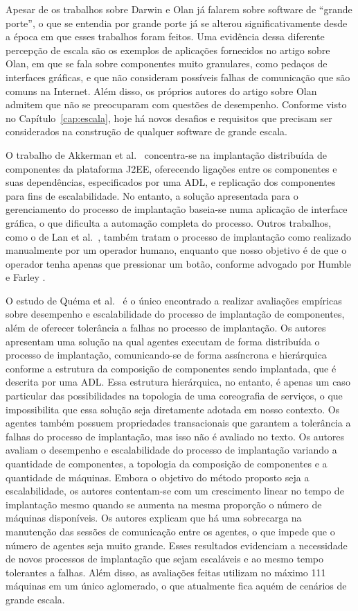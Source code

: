 Apesar de os trabalhos sobre Darwin e Olan já falarem sobre software de ``grande porte'', o que se entendia por grande porte já se alterou significativamente desde a época em que esses trabalhos foram feitos. Uma evidência dessa diferente percepção de escala são os exemplos de aplicações fornecidos no artigo sobre Olan, em que se fala sobre componentes muito granulares, como pedaços de interfaces gráficas, e que não consideram possíveis falhas de comunicação que são comuns na Internet. Além disso, os próprios autores do artigo sobre Olan admitem que não se preocuparam com questões de desempenho. Conforme visto no Capítulo~\ref{cap:escala}, hoje há novos desafios e requisitos que precisam ser considerados na construção de qualquer software de grande escala.

O trabalho de Akkerman et al.~\cite{akkerman2005j2ee} concentra-se na implantação distribuída de componentes da plataforma J2EE, oferecendo ligações entre os componentes e suas dependências, especificados por uma ADL, e replicação dos componentes para fins de escalabilidade. No entanto, a solução apresentada para o gerenciamento do processo de implantação baseia-se numa aplicação de interface gráfica, o que dificulta a automação completa do processo. Outros trabalhos, como o de Lan et al.~\cite{lan2005architecture}, também tratam o processo de implantação como realizado manualmente por um operador humano, enquanto que nosso objetivo é de que o operador tenha apenas que pressionar um botão, conforme advogado por Humble e Farley \cite{Humble2011Continuous}.

O estudo de Quéma et al.~\cite{quema2004hierarchical} é o único encontrado a realizar avaliações empíricas sobre desempenho e escalabilidade do processo de implantação de componentes, além de oferecer tolerância a falhas no processo de implantação. Os autores apresentam uma solução na qual agentes executam de forma distribuída o processo de implantação, comunicando-se de forma assíncrona e hierárquica conforme a estrutura da composição de componentes sendo implantada, que é descrita por uma ADL. Essa estrutura hierárquica, no entanto, é apenas um caso particular das possibilidades na topologia de uma coreografia de serviços, o que impossibilita que essa solução seja diretamente adotada em nosso contexto. Os agentes também possuem propriedades transacionais que garantem a tolerância a falhas do processo de implantação, mas isso não é avaliado no texto. Os autores avaliam o desempenho e escalabilidade do processo de implantação variando a quantidade de componentes, a topologia da composição de componentes e a quantidade de máquinas. Embora o objetivo do método proposto seja a escalabilidade, os autores contentam-se com um crescimento linear no tempo de implantação mesmo quando se aumenta na mesma proporção o número de máquinas disponíveis. Os autores explicam que há uma sobrecarga na manutenção das sessões de comunicação entre os agentes, o que impede que o número de agentes seja muito grande. Esses resultados evidenciam a necessidade de novos processos de implantação que sejam escaláveis e ao mesmo tempo tolerantes a falhas. Além disso, as avaliações feitas utilizam no máximo 111 máquinas em um único aglomerado, o que atualmente fica aquém de cenários de grande escala. 

